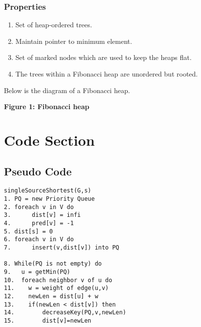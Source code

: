 \documentclass{article}
\begin{document}
\subsubsection{Properties}
\begin{enumerate}
\item Set of heap-ordered trees. 
\item Maintain pointer to minimum element.
\item Set of marked nodes which are used to keep the heaps flat.
\item The trees within a Fibonacci heap are unordered but rooted.
\end{enumerate}

Below is the diagram of a Fibonacci heap.
\begin{center}
    

\newline
\textbf{Figure 1: Fibonacci heap}
\newline
\end{center}

\section{Code Section}
\subsection{Pseudo Code}
 \begin{verbatim}
singleSourceShortest(G,s)
1. PQ = new Priority Queue
2. foreach v in V do 
3. 		dist[v] = infi
4. 		pred[v] = -1
5. dist[s] = 0
6. foreach v in V do
7.		insert(v,dist[v]) into PQ

8. While(PQ is not empty) do
9.   u = getMin(PQ)
10.  foreach neighbor v of u do
11.    w = weight of edge(u,v)
12.    newLen = dist[u] + w
13.    if(newLen < dist[v]) then
14.        decreaseKey(PQ,v,newLen)
15.        dist[v]=newLen   
 
 \end{verbatim}
\end{document}
